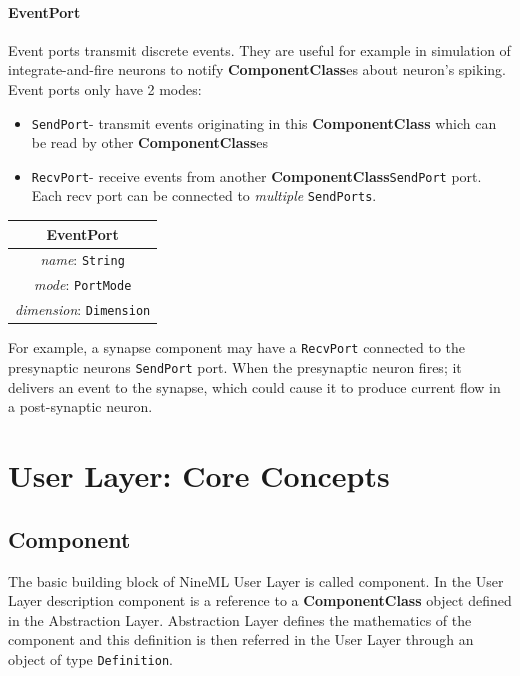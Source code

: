 \documentclass{article}
\newcommand{\ComponentClass}{{\bf{ComponentClass}}\xspace}
\newcommand{\ComponentClasses}{{\bf{ComponentClass}}es\xspace}
\newcommand{\SendPort}{{\tt{SendPort}}\xspace}
\newcommand{\RecvPort}{{\tt{RecvPort}}\xspace}
\newcommand{\SendPorts}{{\tt{SendPorts}}\xspace}
\begin{document}
\paragraph{EventPort}

Event ports transmit discrete events. They are useful for example in
simulation of integrate-and-fire neurons to notify \ComponentClasses about neuron's
spiking. Event ports only have 2 modes:

\begin{itemize}
\item \SendPort - transmit events originating in this \ComponentClass which can be
read by
other \ComponentClasses
\item \RecvPort - receive events from another \ComponentClass \SendPort port.
Each recv port can be connected to \emph{multiple} \SendPorts.
\end{itemize}

\begin{table}[htb]
\center
\begin{tabular}{|c|}
\hline
\hline
EventPort \\
\hline
\hline
{\em name}: {\tt String} \\
\hline
{\em mode}: {\tt PortMode} \\
\hline
{\em dimension}: {\tt Dimension} \\
\hline
\end{tabular}
\end{table}

For example, a synapse component may have a \RecvPort connected to the
presynaptic neurons \SendPort port. When the presynaptic neuron fires;
it delivers an event to the synapse, which could cause it to produce current
flow in a post-synaptic neuron.

\newpage

\section{User Layer: Core Concepts}
\label{UserL}

\subsection{Component}

The basic building block of NineML User Layer is called component. In the
User Layer description component is a reference to a \ComponentClass
object defined in the Abstraction Layer. Abstraction Layer defines the
mathematics of the component and this definition is then referred in the
User Layer through an object of type {\tt Definition}.
\end{document}
